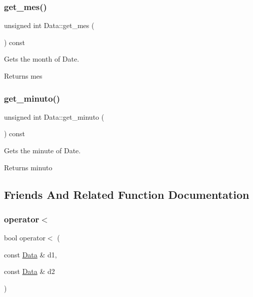 \subsubsection{\texorpdfstring{get\+\_\+mes()}{get\_mes()}}
{\footnotesize\ttfamily unsigned int Data\+::get\+\_\+mes (\begin{DoxyParamCaption}{ }\end{DoxyParamCaption}) const}



Gets the month of Date. 

\begin{DoxyReturn}{Returns}
mes 
\end{DoxyReturn}
\mbox{\label{class_data_a0bf464cec85f16bc16ccc14de621bfc9}} 
\subsubsection{\texorpdfstring{get\+\_\+minuto()}{get\_minuto()}}
{\footnotesize\ttfamily unsigned int Data\+::get\+\_\+minuto (\begin{DoxyParamCaption}{ }\end{DoxyParamCaption}) const}



Gets the minute of Date. 

\begin{DoxyReturn}{Returns}
minuto 
\end{DoxyReturn}


\subsection{Friends And Related Function Documentation}
\mbox{\label{class_data_ae1c517e1665d5bc0854d28cb04d10992}} 
\subsubsection{\texorpdfstring{operator$<$}{operator<}}
{\footnotesize\ttfamily bool operator$<$ (\begin{DoxyParamCaption}\item[{const \hyperlink{class_data}{Data} \&}]{d1,  }\item[{const \hyperlink{class_data}{Data} \&}]{d2 }\end{DoxyParamCaption})\hspace{0.3cm}{\ttfamily [friend]}}



